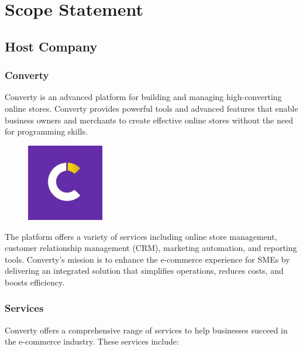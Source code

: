 \chapter{Scope Statement}
\setcounter{minitocdepth}{1}
\minitoc
\newpage

\section{Host Company}
\subsection{Converty}
Converty is an advanced platform for building and managing high-converting online stores. Converty provides powerful tools and advanced features that enable business owners and merchants to create effective online stores without the need for programming skills.

\begin{figure}[h]
  \centering
  \includegraphics[width=0.3\textwidth]{Images/convertyLogo.jpeg}
  \label{fig:Converty Logo}
\end{figure}

The platform offers a variety of services including online store management, customer relationship management (CRM), marketing automation, and reporting tools. Converty's mission is to enhance the e-commerce experience for SMEs by delivering an integrated solution that simplifies operations, reduces costs, and boosts efficiency.
\newline

\subsection{Services}
Converty offers a comprehensive range of services to help businesses succeed in the e-commerce industry. These services include:

